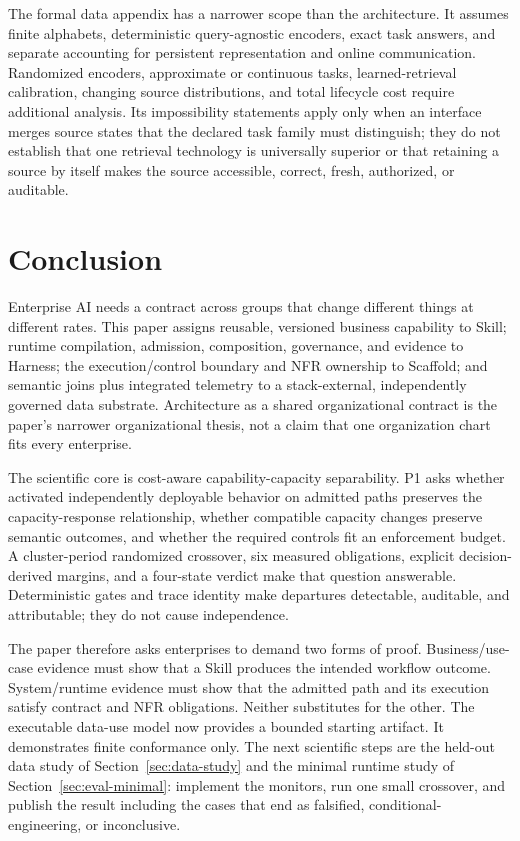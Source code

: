 The formal data appendix has a narrower scope than the architecture. It assumes finite alphabets, deterministic query-agnostic encoders, exact task answers, and separate accounting for persistent representation and online communication. Randomized encoders, approximate or continuous tasks, learned-retrieval calibration, changing source distributions, and total lifecycle cost require additional analysis. Its impossibility statements apply only when an interface merges source states that the declared task family must distinguish; they do not establish that one retrieval technology is universally superior or that retaining a source by itself makes the source accessible, correct, fresh, authorized, or auditable.

\section{Conclusion}
\label{sec:conclusion}

Enterprise AI needs a contract across groups that change different things at different rates. This paper assigns reusable, versioned business capability to Skill; runtime compilation, admission, composition, governance, and evidence to Harness; the execution/control boundary and NFR ownership to Scaffold; and semantic joins plus integrated telemetry to a stack-external, independently governed data substrate. Architecture as a shared organizational contract is the paper's narrower organizational thesis, not a claim that one organization chart fits every enterprise.

The scientific core is cost-aware capability-capacity separability. P1 asks whether activated independently deployable behavior on admitted paths preserves the capacity-response relationship, whether compatible capacity changes preserve semantic outcomes, and whether the required controls fit an enforcement budget. A cluster-period randomized crossover, six measured obligations, explicit decision-derived margins, and a four-state verdict make that question answerable. Deterministic gates and trace identity make departures detectable, auditable, and attributable; they do not cause independence.

The paper therefore asks enterprises to demand two forms of proof. Business/use-case evidence must show that a Skill produces the intended workflow outcome. System/runtime evidence must show that the admitted path and its execution satisfy contract and NFR obligations. Neither substitutes for the other. The executable data-use model now provides a bounded starting artifact. It demonstrates finite conformance only. The next scientific steps are the held-out data study of Section~\ref{sec:data-study} and the minimal runtime study of Section~\ref{sec:eval-minimal}: implement the monitors, run one small crossover, and publish the result including the cases that end as falsified, conditional-engineering, or inconclusive.

